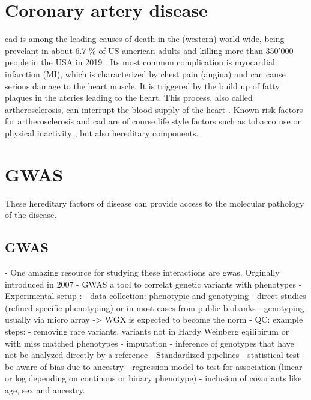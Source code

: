 \section{Coronary artery disease}
\label{sec:cad}
\ac{cad} is among the leading causes of death in the (western) world wide, being prevelant in about 6.7 \% of US-american adults and killing more than 350'000 people in the USA in 2019 \cite{cdcHeartDiseaseFacts2022, fryarPrevalenceUncontrolledRisk2012}. Its most common complication is myocardial infarction (MI), which is characterized by chest pain (angina) and can cause serious damage to the heart muscle. It is triggered by the build up of fatty plaques in the ateries leading to the heart. This process, also called artherosclerosis, can interrupt the blood supply of the heart \cite{HeartAttack2017}. Known risk factors for artherosclerosis and \ac{cad} are of course life style factors such as tobacco use or physical inactivity \cite{taskforcemembers2013ESCGuidelines2013}, but also hereditary components.

\section{GWAS}
\label{sec:gwas}
These hereditary factors of disease can provide access to the molecular pathology of the disease.

    \subsection{GWAS}
    \label{subsec:gwas_general}
    - One amazing resource for studying these interactions are \ac{gwas}. Orginally introduced in 2007
    - GWAS a tool to correlat genetic variants with phenotypes
    - Experimental setup :
        - data collection: phenotypic and genotyping
            - direct studies (refined specific phenotyping) or in most cases from public biobanks
            - genotyping usually via micro array -> WGX is expected to become the norm
        - QC: example steps:
            - removing rare variants, variants not in Hardy Weinberg eqilibirum or with miss matched phenotypes
        - imputation
            - inference of genotypes that have not be analyzed directly by a reference
            - Standardized pipelines
        - statistical test
            - be aware of bias due to ancestry
            - regression model to test for association (linear or log depending on continous or binary phenotype)
            - inclusion of covariants like age, sex and ancestry.

